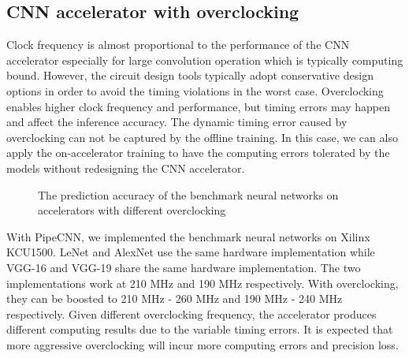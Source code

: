 \subsection{CNN accelerator with overclocking}
Clock frequency is almost proportional to the performance of the CNN accelerator 
especially for large convolution operation which is typically computing bound. 
However, the circuit design tools typically adopt conservative design options 
in order to avoid the timing violations in the worst case. Overclocking enables 
higher clock frequency and performance, but timing errors may happen and affect 
the inference accuracy. The dynamic timing error caused by overclocking 
can not be captured by the offline training. In this case, we can also apply the on-accelerator 
training to have the computing errors tolerated by the models without 
redesigning the CNN accelerator.
\begin{figure}
        \center
	\qquad
	\qquad
        \qquad
	\caption{The prediction accuracy of the benchmark neural networks on accelerators with different overclocking}
        \label{fig:overclock-accuracy}
\end{figure}


With PipeCNN, we implemented the benchmark neural networks on Xilinx KCU1500. 
LeNet and AlexNet use the same hardware implementation 
while VGG-16 and VGG-19 share the same hardware implementation. 
The two implementations work at 210 MHz and 190 MHz respectively.
With overclocking, they can be boosted to 210 MHz - 260 MHz and 
190 MHz - 240 MHz respectively. Given different overclocking frequency, 
the accelerator produces different computing results due to the variable
timing errors. It is expected that more aggressive overclocking will incur 
more computing errors and precision loss. 

